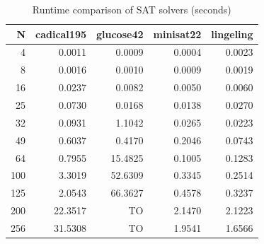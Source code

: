 \begin{table}[htbp]
\centering
\caption{Runtime comparison of SAT solvers (seconds)}
\label{tab:exp2_solvers}
\begin{tabular}{rrrrr}
\hline
N & cadical195 & glucose42 & minisat22 & lingeling \\
\hline
4 & 0.0011 & 0.0009 & 0.0004 & 0.0023 \\
8 & 0.0016 & 0.0010 & 0.0009 & 0.0019 \\
16 & 0.0237 & 0.0082 & 0.0050 & 0.0060 \\
25 & 0.0730 & 0.0168 & 0.0138 & 0.0270 \\
32 & 0.0931 & 1.1042 & 0.0265 & 0.0223 \\
49 & 0.6037 & 0.4170 & 0.2046 & 0.0743 \\
64 & 0.7955 & 15.4825 & 0.1005 & 0.1283 \\
100 & 3.3019 & 52.6309 & 0.3345 & 0.2514 \\
125 & 2.0543 & 66.3627 & 0.4578 & 0.3237 \\
200 & 22.3517 & TO & 2.1470 & 2.1223 \\
256 & 31.5308 & TO & 1.9541 & 1.6566 \\
\hline
\end{tabular}
\end{table}
